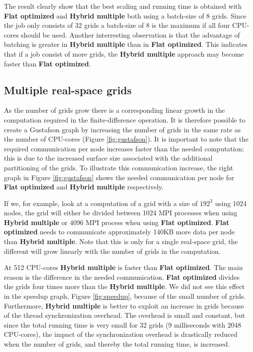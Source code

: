 \documentclass[preprint,3p,times,twocolumn]{elsarticle}
\begin{document}
The result clearly show that the best scaling and running time is obtained with \textbf{Flat optimized} and \textbf{Hybrid multiple} both using a batch-size of 8 grids. Since the job only consists of 32 grids a batch-size of 8 is the maximum if all four CPU-cores should be used. Another interresting observation is that the advantage of batching is greater in \textbf{Hybrid multiple} than in \textbf{Flat optimized}. This indicates that if a job consist of more grids, the \textbf{Hybrid multiple} approach may become faster than \textbf{Flat optimized}.


\subsection{Multiple real-space grids}
As the number of grids grow there is a corresponding linear growth in the computation required in the finite-difference operation. It is therefore possible to create a Gustafson graph by increasing the number of grids in the same rate as the number of CPU-cores (Figure \ref{fig:gustafson}). It is important to note that the required communication per node increases faster than the needed computation; this is due to the increased surface size associated with the additional partitioning of the grids. To illustrate this communication increase, the right graph in Figure \ref{fig:gustafson} shows the needed communication per node for \textbf{Flat optimized} and \textbf{Hybrid multiple} respectively.

If we, for example, look at a computation of a grid with a size of $192^3$ using 1024 nodes, the grid will either be divided between 1024 MPI processes when using \textbf{Hybrid multiple} or 4096 MPI process when using \textbf{Flat optimized}. \textbf{Flat optimized} needs to communicate approximately 140KB more data per node than \textbf{Hybrid multiple}. Note that this is only for a single real-space grid, the different will grow linearly with the number of grids in the computation.

At 512 CPU-cores \textbf{Hybrid multiple} is faster than \textbf{Flat optimized}. The main reason is the difference in the needed communication. \textbf{Flat optimized} divides the grids four times more than the \textbf{Hybrid multiple}. We did not see this effect in the speedup graph, Figure \ref{fig:speedup}, because of the small number of grids. Furthermore, \textbf{Hybrid multiple} is better to exploit an increase in grids because of the thread synchronization overhead. The overhead is small and constant, but since the total running time is very small for 32 grids (9 milliseconds with 2048 CPU-cores), the impact of the synchronization overhead is drastically reduced when the number of grids, and thereby the total running time, is increased.
\end{document}
